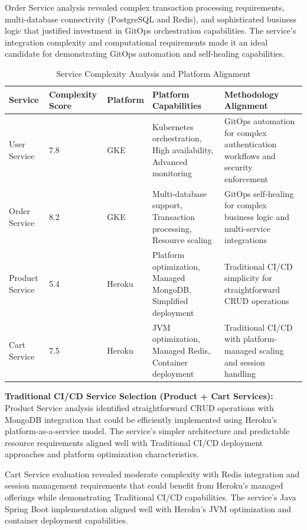 Order Service analysis revealed complex transaction processing requirements, multi-database connectivity (PostgreSQL and Redis), and sophisticated business logic that justified investment in GitOps orchestration capabilities. The service's integration complexity and computational requirements made it an ideal candidate for demonstrating GitOps automation and self-healing capabilities.

\begin{table}[h]
\centering
\begin{tabular}{|p{2.5cm}|p{1.5cm}|p{1.5cm}|p{4cm}|p{5cm}|}
\hline
\textbf{Service} & \textbf{Complexity Score} & \textbf{Platform} & \textbf{Platform Capabilities} & \textbf{Methodology Alignment} \\
\hline
User Service & 7.8 & GKE & Kubernetes orchestration, High availability, Advanced monitoring & GitOps automation for complex authentication workflows and security enforcement \\
\hline
Order Service & 8.2 & GKE & Multi-database support, Transaction processing, Resource scaling & GitOps self-healing for complex business logic and multi-service integrations \\
\hline
Product Service & 5.4 & Heroku & Platform optimization, Managed MongoDB, Simplified deployment & Traditional CI/CD simplicity for straightforward CRUD operations \\
\hline
Cart Service & 7.5 & Heroku & JVM optimization, Managed Redis, Container deployment & Traditional CI/CD with platform-managed scaling and session handling \\
\hline
\end{tabular}
\caption{Service Complexity Analysis and Platform Alignment}
\label{tab:service-complexity-analysis}
\end{table}

\textbf{Traditional CI/CD Service Selection (Product + Cart Services):}
Product Service analysis identified straightforward CRUD operations with MongoDB integration that could be efficiently implemented using Heroku's platform-as-a-service model. The service's simpler architecture and predictable resource requirements aligned well with Traditional CI/CD deployment approaches and platform optimization characteristics.

Cart Service evaluation revealed moderate complexity with Redis integration and session management requirements that could benefit from Heroku's managed offerings while demonstrating Traditional CI/CD capabilities. The service's Java Spring Boot implementation aligned well with Heroku's JVM optimization and container deployment capabilities.

